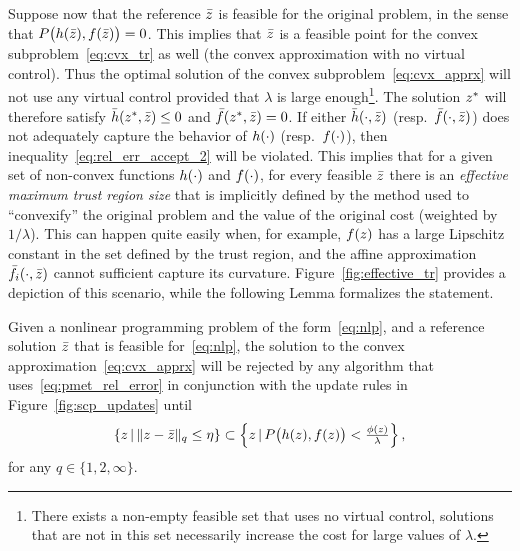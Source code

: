 \documentclass[letterpaper, 10 pt, conference]{ieeeconf}
\begin{document}
Suppose now that the reference $\bar{z}$ is feasible for the original problem, in the sense that $P\big(h(\bar{z}),f(\bar{z})\big)=0$. This implies that $\bar{z}$ is a feasible point for the convex subproblem~\eqref{eq:cvx_tr} as well (the convex approximation with no virtual control). Thus the optimal solution of the convex subproblem~\eqref{eq:cvx_apprx} will not use any virtual control provided that $\lambda$ is large enough\footnote{There exists a non-empty feasible set that uses no virtual control, solutions that are not in this set necessarily increase the cost for large values of $\lambda$.}. The solution $z^*$ will therefore satisfy $\bar{h}(z^*,\bar{z})\leq0$ and $\bar{f}(z^*,\bar{z})=0$. If either $\bar{h}(\cdot,\bar{z})$ (resp.~$\bar{f}(\cdot,\bar{z})$) does not adequately capture the behavior of $h(\cdot)$ (resp.~$f(\cdot)$), then inequality~\eqref{eq:rel_err_accept_2} will be violated. This implies that for a given set of non-convex functions $h(\cdot)$ and $f(\cdot)$, for every feasible $\bar{z}$ there is an \textit{effective maximum trust region size} that is implicitly defined by the method used to ``convexify'' the original problem and the value of the original cost (weighted by $1/\lambda$). This can happen quite easily when, for example, $f(z)$ has a large Lipschitz constant in the set defined by the trust region, and the affine approximation $\bar{f}_i(\cdot,\bar{z})$ cannot sufficient capture its curvature. Figure~\ref{fig:effective_tr} provides a depiction of this scenario, while the following Lemma formalizes the statement.

\begin{lemma}\label{lemma:rel_err_effective_tr}
Given a nonlinear programming problem of the form~\eqref{eq:nlp}, and a reference solution $\bar{z}$ that is feasible for~\eqref{eq:nlp}, the solution to the convex approximation~\eqref{eq:cvx_apprx} will be rejected by any algorithm that uses~\eqref{eq:pmet_rel_error} in conjunction with the update rules in Figure~\ref{fig:scp_updates} until
\begin{equation}
\left\{z\,|\,\|z-\bar{z}\|_q \leq \eta \right\} \subset \left\{z\,|\,P\big(h(z),f(z)\big) < \tfrac{\phi(z)}{\lambda} \right\},
\label{eq:rel_err_effective_tr}
\end{equation}
for any $q\in\{1,2,\infty\}$. %
\end{lemma}

\end{document}
